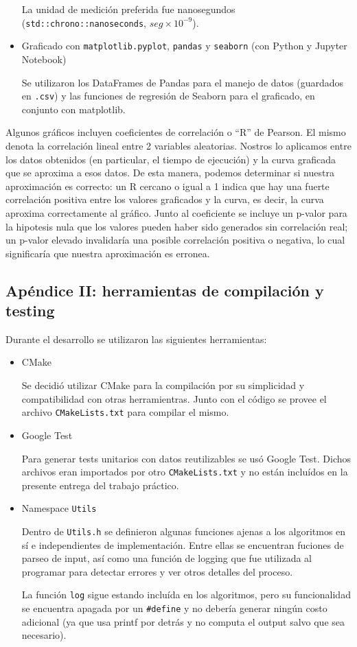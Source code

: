 \begin{itemize}
		La unidad de medición preferida fue nanosegundos (\texttt{std::chrono::nanoseconds}, $seg \times 10^{-9}$).

		\item Graficado con \texttt{matplotlib.pyplot}, \texttt{pandas} y \texttt{seaborn} (con Python y Jupyter Notebook)

		Se utilizaron los DataFrames de Pandas para el manejo de datos (guardados en \texttt{.csv}) y las funciones de regresión de Seaborn para el graficado, en conjunto con matplotlib.

	\end{itemize}

	Algunos gráficos incluyen coeficientes de correlación o ``R'' de Pearson. El mismo denota la correlación lineal entre 2 variables aleatorias. Nostros lo aplicamos entre los datos obtenidos (en particular, el tiempo de ejecución) y la curva graficada que se aproxima a esos datos. De esta manera, podemos determinar si nuestra aproximación es correcto: un R cercano o igual a 1 indica que hay una fuerte correlación positiva entre los valores graficados y la curva, es decir, la curva aproxima correctamente al gráfico. Junto al coeficiente se incluye un p-valor para la hipotesis nula que los valores pueden haber sido generados sin correlación real; un p-valor elevado invalidaría una posible correlación positiva o negativa, lo cual significaría que nuestra aproximación es erronea.

	\subsection{Apéndice II: herramientas de compilación y testing}
	Durante el desarrollo se utilizaron las siguientes herramientas:

	\begin{itemize}
		\item CMake

		Se decidió utilizar CMake para la compilación por su simplicidad y compatibilidad con otras herramientras. Junto con el código se provee el archivo \texttt{CMakeLists.txt} para compilar el mismo.

		\item Google Test

		Para generar tests unitarios con datos reutilizables se usó Google Test. Dichos archivos eran importados por otro \texttt{CMakeLists.txt} y no están incluídos en la presente entrega del trabajo práctico.

		\item Namespace \texttt{Utils}

		Dentro de \texttt{Utils.h} se definieron algunas funciones ajenas a los algoritmos en sí e independientes de implementación. Entre ellas se encuentran fuciones de parseo de input, así como una función de logging que fue utilizada al programar para detectar errores y ver otros detalles del proceso.

		La función \texttt{log} sigue estando incluída en los algoritmos, pero su funcionalidad se encuentra apagada por un \texttt{\#define} y no debería generar ningún costo adicional (ya que usa printf por detrás y no computa el output salvo que sea necesario).
	\end{itemize}